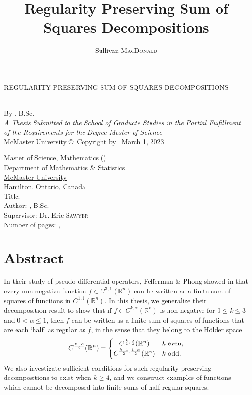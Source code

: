 \documentclass[oneside,hidelinks,indentfirst,10pt]{book}
\title{Regularity Preserving Sum of Squares Decompositions}
\author{Sullivan \textsc{MacDonald}}
\begin{document}
\frontmatter
\pagestyle{plain}


\null\vfill
\begin{center}
REGULARITY PRESERVING SUM OF SQUARES DECOMPOSITIONS
\end{center}
\vspace{15cm}
\newpage


\begin{center}
\vfill\textsc{\Large \ttitle\\}\vfill
By \authorname, B.Sc.\\\vfill
{\large \textit{A Thesis Submitted to the School of Graduate Studies in the Partial Fulfillment of the Requirements for the Degree Master of Science}}\\\vfill
{\large \href{http://www.mcmaster.ca/}{McMaster University} \copyright\, Copyright by \authorname\,  March 1, 2023}\\[4cm]
\end{center}
\newpage


\setcounter{page}{2}
\noindent Master of Science, Mathematics (\the\year) \\
\href{https://www.math.mcmaster.ca/}{Department of Mathematics \& Statistics}\\
\href{http://www.mcmaster.ca/}{McMaster University}\\
Hamilton, Ontario, Canada\\[1.5cm]
Title: \ttitle\\
Author: \authorname, B.Sc.\\
Supervisor: Dr. Eric \textsc{Sawyer}\\ 
Number of pages: \pageref{lastoffront}, \pageref{LastPage}
\newpage


\section*{\Huge Abstract}


In their study of pseudo-differential operators, Fefferman \& Phong showed in \cite{Fefferman-Phong} that every non-negative function \(f\in C^{3,1}(\mathbb{R}^n)\) can be written as a finite sum of squares of functions in \(C^{1,1}(\mathbb{R}^n)\). In this thesis, we generalize their decomposition result to show that if \(f\in C^{k,\alpha}(\mathbb{R}^n)\) is non-negative for \(0\leq k\leq 3\) and \(0<\alpha\leq 1\), then \(f\) can be written as a finite sum of squares of functions that are each `half' as regular as \(f\), in the sense that they belong to the H\"older space
\[
    C^\frac{k+\alpha}{2}(\mathbb{R}^n)=\begin{cases}\hfil C^{\frac{k}{2},\frac{\alpha}{2}}(\mathbb{R}^n) & k\textrm{ even}, \\ C^{\frac{k-1}{2},\frac{1+\alpha}{2}}(\mathbb{R}^n) & k\textrm{ odd}.
    \end{cases}
\]
We also investigate sufficient conditions for such regularity preserving decompositions to exist when \(k\geq 4\), and we construct examples of functions which cannot be decomposed into finite sums of half-regular squares.
\end{document}
